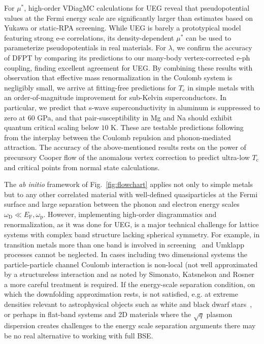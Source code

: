 \documentclass[%
 reprint,
superscriptaddress,
 amsmath,amssymb,
 aps,
prx,
]{revtex4-2}
\newcommand{\txc}{\text{c}}
\newcommand{\txp}{\text{p}}
\newcommand{\txD}{\text{D}}
\newcommand{\txF}{\text{F}}
\begin{document}
For $\mu^*$, high-order VDiagMC calculations for UEG reveal that pseudopotential values at the Fermi energy scale are significantly
larger than estimates based on Yukawa or static-RPA screening. 
While UEG is barely a prototypical model featuring strong e-e correlations, its density-dependent $\mu^*$ can be used to parameterize pseudopotentials
in real materials. For $\lambda$, we confirm the accuracy of DFPT by comparing its predictions to our many-body vertex-corrected e-ph coupling, finding excellent agreement for UEG. By combining these results 
with observation that effective mass renormalization in the 
Coulomb system is negligibly small, we arrive at fitting-free 
predictions for $T_c$ in simple metals with an order-of-magnitude 
improvement for sub-Kelvin superconductors. In particular, we
predict that s-wave superconductivity in aluminum is suppressed to zero
at $60$ GPa, and that pair-susceptibility in Mg and Na should exhibit 
quantum critical scaling below $10$ K. These are testable predictions
following from the interplay between the Coulomb repulsion and phonon-mediated attraction.
The accuracy of the above-mentioned results rests on the power of precursory Cooper flow of the anomalous vertex correction to predict ultra-low $T_\txc$ and critical points from normal state calculations.

The \emph{ab initio} framework of Fig.~\ref{fig:flowchart} applies not only to simple metals but to any other correlated material
with well-defined quasiparticles at the Fermi surface and
large separation between the phonon and electron energy scales $\omega_\txD \ll E_\txF, \omega_\txp $.
%
However, implementing high-order diagrammatics and renormalization,
as it was done for UEG, is a major technical challenge for lattice
systems with complex band structure lacking spherical symmetry. For example, in transition metals more than one band is involved in
screening~\cite{schrieffer_1969} and Umklapp processes cannot be neglected. {In cases including two dimensional systems the particle-particle channel Coulomb interaction is  non-local (not well approximated by a structureless interaction and as noted by Simonato, Katsnelson and Rosner \cite{Simonato23} a more careful treatment is required. }
If the energy-scale separation condition, on which the downfolding approximation rests, is not satisfied, e.g. at extreme densities relevant to astrophysical objects such as white and black dwarf stars~\cite{ginzburg_superconductivity_1968}, {or perhaps in flat-band systems and 2D materials where the $\sqrt{q}$ plasmon dispersion creates challenges to the energy scale separation arguments} there may be no real alternative to working with full BSE.
\end{document}
